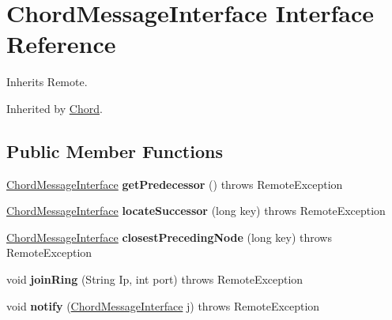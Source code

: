 \hypertarget{interface_chord_message_interface}{}\section{Chord\+Message\+Interface Interface Reference}
\label{interface_chord_message_interface}


Inherits Remote.



Inherited by \hyperlink{class_chord}{Chord}.

\subsection*{Public Member Functions}
\begin{DoxyCompactItemize}
\item 
\mbox{\label{interface_chord_message_interface_ab07c08ba6088ef880eaf4ebae8281c51}} 
\hyperlink{interface_chord_message_interface}{Chord\+Message\+Interface} {\bfseries get\+Predecessor} ()  throws Remote\+Exception
\item 
\mbox{\label{interface_chord_message_interface_ab7df61ab2cfee0f39206014d7a42b063}} 
\hyperlink{interface_chord_message_interface}{Chord\+Message\+Interface} {\bfseries locate\+Successor} (long key)  throws Remote\+Exception
\item 
\mbox{\label{interface_chord_message_interface_a1d54a4ccd64382455af7dccfd0d6f95f}} 
\hyperlink{interface_chord_message_interface}{Chord\+Message\+Interface} {\bfseries closest\+Preceding\+Node} (long key)  throws Remote\+Exception
\item 
\mbox{\label{interface_chord_message_interface_abc5a9483416a6b8ae7330b324869e236}} 
void {\bfseries join\+Ring} (String Ip, int port)  throws Remote\+Exception
\item 
\mbox{\label{interface_chord_message_interface_abbb77f94541073d79284d35f970e0eb4}} 
void {\bfseries notify} (\hyperlink{interface_chord_message_interface}{Chord\+Message\+Interface} j)  throws Remote\+Exception
\item 
\mbox{\label{interface_chord_message_interface_a8165b3fb53905e657c70b66223197561}} 

\end{DoxyCompactItemize}
